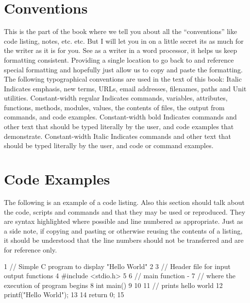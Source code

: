 \section{Conventions}

This is the part of the book where we tell you about all the “conventions” like code listing, notes, etc. etc. But I will let you in on a little secret its as much for the writer as it is for you. See as a writer in a word processor, it helps us keep formatting consistent. Providing a single location to go back to and reference special formatting and hopefully just allow us to copy and paste the formatting. 
The following typographical conventions are used in the text of this book:
Italic
Indicates emphasis, new terms, URLs, email addresses, filenames, paths and Unit utilities.
Constant-width regular
Indicates commands, variables, attributes, functions, methods, modules, values, the contents of files, the output from commands, and code examples.
Constant-width bold
Indicates commands and other text that should be typed literally by the user, and code examples that demonstrate.
Constant-width Italic
Indicates commands and other text that should be typed literally by the user, and code or command examples.

\section{Code Examples}

The following is an example of a code listing. Also this section should talk about the code, scripts and commands and that they may be used or reproduced. They are syntax highlighted where possible and line numbered as appropriate. Just as a side note, if copying and pasting or otherwise reusing the contents of a listing, it should be understood that the line numbers should not be transferred and are for reference only.

 1  // Simple C program to display "Hello World"
 2  
 3  // Header file for input output functions
 4  #include <stdio.h>
 5  
 6  // main function -
 7  // where the execution of program begins
 8  int main()
 9  {
10  
11  	// prints hello world
12  	printf("Hello World");
13  
14  	return 0;
15  }


